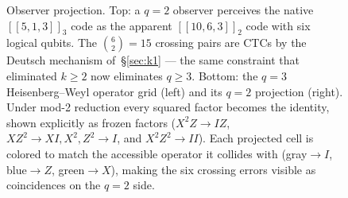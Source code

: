\documentclass[11pt,a4paper]{article}
\newcommand{\Cq}[4]{[\![#1,#2,#3]\!]_{#4}}
\begin{document}
\begin{figure}[h]
\caption{Observer projection. Top: a $q=2$ observer perceives the native $\Cq{5}{1}{3}{3}$ code as the apparent $\Cq{10}{6}{3}{2}$ code with six logical qubits. The $\binom{6}{2}=15$ crossing pairs are CTCs by the
Deutsch mechanism of~\S\ref{sec:k1} --- the same constraint that eliminated $k\geq2$ now eliminates $q\geq3$. Bottom: the $q=3$ Heisenberg--Weyl operator grid (left) and its $q=2$ projection (right). Under mod-2 reduction every squared factor becomes the identity, shown explicitly as frozen factors ($X^2Z\to IZ$, $XZ^2\to XI, X^2,Z^2 \to I$, and $X^2Z^2\to II$). Each projected cell is colored to match the accessible operator it collides with (gray$\to I$, blue$\to Z$, green$\to X$), making the six crossing errors visible as coincidences on the $q=2$ side.}
\label{fig:obs}
\end{figure}
\end{document}
